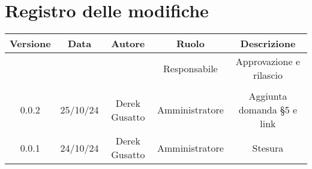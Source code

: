 
\section*{Registro delle modifiche}
\begin{table}[H]
    \begin{tabular}{|c|c|c|c|c|}
        \hline
         \textbf{Versione} &  \textbf{Data} &  \textbf{Autore} &  \textbf{Ruolo} & \textbf{Descrizione} \\
          \hline
          &  &  & Responsabile & Approvazione e rilascio\\
          \hline
          &  &  &  &  \\
          \hline
          0.0.2& 25/10/24 & Derek Gusatto & Amministratore & Aggiunta domanda §5 e link  \\
          \hline
          0.0.1& 24/10/24 & Derek Gusatto & Amministratore & Stesura \\
          \hline
    \end{tabular}
\end{table}
